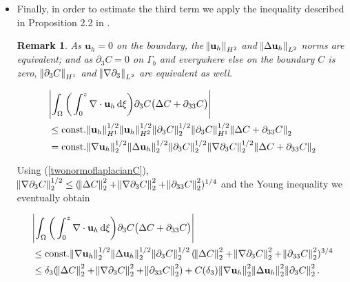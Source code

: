 \documentclass[11pt]{article}
\newtheorem{remark}{Remark}
\newcommand*\diff{\mathop{}\!\mathrm{d}}
\begin{document}
\begin{itemize}
\item Finally, in order to estimate the third term we apply the inequality described in Proposition 2.2 in \cite{cao2003global}.

\begin{remark} As  $\mathbf{u}_h = 0$ on the boundary, the $\norm{\mathbf{u}_h}_{H^2}$ and $\norm{\Delta \mathbf{u}_h}_{L^2} $ norms are equivalent; and as $\partial_3 C = 0$ on $\Gamma_b$ and everywhere else on the boundary $C$ is zero, $\norm{\partial_3 C}_{H^1}$ and $\norm{\nabla \partial_3}_{L^2}$ are equivalent as well.
\end{remark}

\begin{equation}
  \begin{split}
  & \abs{ \int_\Omega  \bigg( \int_0^z \nabla \cdot \mathbf{u}_h \diff \xi \bigg) \partial_3 C  \big( \Delta C + \partial_{33} C \big)} \\
  & \leq \text{const.} \norm{\mathbf{u}_h}_{H^1}^{1/2} \norm{\mathbf{u}_h}_{H^2}^{1/2} \norm{\partial_3 C}_2^{1/2} \norm{\partial_3 C}_{H^1}^{1/2} \norm{\Delta C + \partial_{33} C}_2 \\
  & = \text{const.} \norm{\nabla \mathbf{u}_h}_2^{1/2} \norm{\Delta \mathbf{u}_h}_2^{1/2} \norm{\partial_3 C}_2^{1/2} \norm{\nabla \partial_3 C}_2^{1/2} \norm{\Delta C + \partial_{33} C}_2
  \end{split}
\end{equation}

Using (\ref{twonormoflaplacianC}), $\norm{\nabla \partial_3 C}_2^{1/2} \leq (\norm{\Delta C}_2^2 + \norm{\nabla \partial_3 C}_2^2 + \norm{\partial_{33} C}_2^2)^{1/4}$ and the Young inequality we eventually obtain

\begin{equation}
  \begin{split}
  & \abs{ \int_\Omega  \bigg( \int_0^z \nabla \cdot \mathbf{u}_h \diff \xi \bigg) \partial_3 C  \big( \Delta C + \partial_{33} C \big)} \\
  & \leq \text{const.} \norm{\nabla \mathbf{u}_h}_2^{1/2} \norm{\Delta \mathbf{u}_h}_2^{1/2} \norm{\partial_3 C}_2^{1/2} (\norm{\Delta C}_2^2 + \norm{\nabla \partial_3 C}_2^2 + \norm{\partial_{33} C}_2^2)^{3/4} \\
  & \leq \delta_3 (\norm{\Delta C}_2^2 + \norm{\nabla \partial_3 C}_2^2 + \norm{\partial_{33} C}_2^2) + C(\delta_3) \norm{\nabla \mathbf{u}_h}_2^2 \norm{\Delta \mathbf{u}_h}_2^2 \norm{\partial_3 C}_2^2.
  \end{split}
\end{equation}
\end{itemize}
\end{document}
